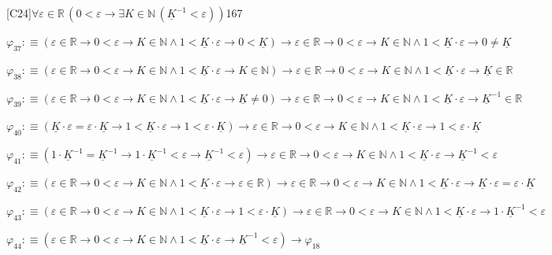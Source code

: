 \begin{fullproof}{[C24]}{$\forall \varepsilon \in \mathbb{R}\,(0 < \varepsilon \to \exists K \in \mathbb{N}\,(\underline{K}^{-1} < \varepsilon))$}{167}
\begin{abbrevlist}
\item $\varphi_{37} :\equiv (\varepsilon \in \mathbb{R} \to 0 < \varepsilon \to K \in \mathbb{N} \land 1 < \underline{K} \cdot \varepsilon \to 0 < \underline{K}) \to \varepsilon \in \mathbb{R} \to 0 < \varepsilon \to K \in \mathbb{N} \land 1 < \underline{K} \cdot \varepsilon \to 0 \neq \underline{K}$
\item $\varphi_{38} :\equiv (\varepsilon \in \mathbb{R} \to 0 < \varepsilon \to K \in \mathbb{N} \land 1 < \underline{K} \cdot \varepsilon \to K \in \mathbb{N}) \to \varepsilon \in \mathbb{R} \to 0 < \varepsilon \to K \in \mathbb{N} \land 1 < \underline{K} \cdot \varepsilon \to \underline{K} \in \mathbb{R}$
\item $\varphi_{39} :\equiv (\varepsilon \in \mathbb{R} \to 0 < \varepsilon \to K \in \mathbb{N} \land 1 < \underline{K} \cdot \varepsilon \to \underline{K} \neq 0) \to \varepsilon \in \mathbb{R} \to 0 < \varepsilon \to K \in \mathbb{N} \land 1 < \underline{K} \cdot \varepsilon \to \underline{K}^{-1} \in \mathbb{R}$
\item $\varphi_{40} :\equiv (\underline{K} \cdot \varepsilon = \varepsilon \cdot \underline{K} \to 1 < \underline{K} \cdot \varepsilon \to 1 < \varepsilon \cdot \underline{K}) \to \varepsilon \in \mathbb{R} \to 0 < \varepsilon \to K \in \mathbb{N} \land 1 < \underline{K} \cdot \varepsilon \to 1 < \varepsilon \cdot \underline{K}$
\item $\varphi_{41} :\equiv (1 \cdot \underline{K}^{-1} = \underline{K}^{-1} \to 1 \cdot \underline{K}^{-1} < \varepsilon \to \underline{K}^{-1} < \varepsilon) \to \varepsilon \in \mathbb{R} \to 0 < \varepsilon \to K \in \mathbb{N} \land 1 < \underline{K} \cdot \varepsilon \to \underline{K}^{-1} < \varepsilon$
\item $\varphi_{42} :\equiv (\varepsilon \in \mathbb{R} \to 0 < \varepsilon \to K \in \mathbb{N} \land 1 < \underline{K} \cdot \varepsilon \to \varepsilon \in \mathbb{R}) \to \varepsilon \in \mathbb{R} \to 0 < \varepsilon \to K \in \mathbb{N} \land 1 < \underline{K} \cdot \varepsilon \to \underline{K} \cdot \varepsilon = \varepsilon \cdot \underline{K}$
\item $\varphi_{43} :\equiv (\varepsilon \in \mathbb{R} \to 0 < \varepsilon \to K \in \mathbb{N} \land 1 < \underline{K} \cdot \varepsilon \to 1 < \varepsilon \cdot \underline{K}) \to \varepsilon \in \mathbb{R} \to 0 < \varepsilon \to K \in \mathbb{N} \land 1 < \underline{K} \cdot \varepsilon \to 1 \cdot \underline{K}^{-1} < \varepsilon$
\item $\varphi_{44} :\equiv (\varepsilon \in \mathbb{R} \to 0 < \varepsilon \to K \in \mathbb{N} \land 1 < \underline{K} \cdot \varepsilon \to \underline{K}^{-1} < \varepsilon) \to \varphi_{18}$

\end{abbrevlist}
\end{fullproof}
